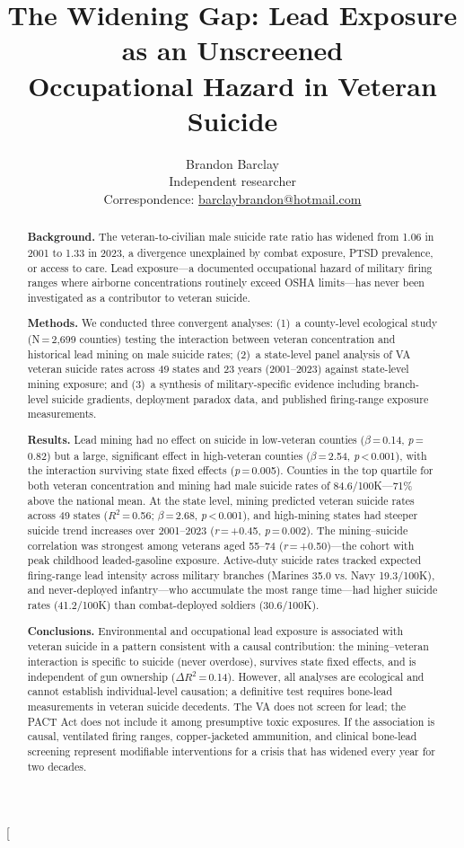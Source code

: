 \documentclass[11pt,twocolumn]{article}
\title{\textbf{The Widening Gap: Lead Exposure as an Unscreened\\Occupational Hazard in Veteran Suicide}}
\author{
    Brandon Barclay\\
    \small{Independent researcher}\\
    \small{Correspondence: \href{mailto:barclaybrandon@hotmail.com}{barclaybrandon@hotmail.com}}
}
\date{}
\begin{document}
\twocolumn[
\maketitle
\begin{@twocolumnfalse}
\begin{abstract}
\noindent\textbf{Background.} The veteran-to-civilian male suicide rate ratio has widened from 1.06 in 2001 to 1.33 in 2023, a divergence unexplained by combat exposure, PTSD prevalence, or access to care. Lead exposure---a documented occupational hazard of military firing ranges where airborne concentrations routinely exceed OSHA limits---has never been investigated as a contributor to veteran suicide.

\noindent\textbf{Methods.} We conducted three convergent analyses: (1)~a county-level ecological study (N\,=\,2,699 counties) testing the interaction between veteran concentration and historical lead mining on male suicide rates; (2)~a state-level panel analysis of VA veteran suicide rates across 49 states and 23 years (2001--2023) against state-level mining exposure; and (3)~a synthesis of military-specific evidence including branch-level suicide gradients, deployment paradox data, and published firing-range exposure measurements.

\noindent\textbf{Results.} Lead mining had no effect on suicide in low-veteran counties ($\beta$\,=\,0.14, \textit{p}\,=\,0.82) but a large, significant effect in high-veteran counties ($\beta$\,=\,2.54, \textit{p}\,<\,0.001), with the interaction surviving state fixed effects (\textit{p}\,=\,0.005). Counties in the top quartile for both veteran concentration and mining had male suicide rates of 84.6/100K---71\% above the national mean. At the state level, mining predicted veteran suicide rates across 49 states ($R^2$\,=\,0.56; $\beta$\,=\,2.68, \textit{p}\,<\,0.001), and high-mining states had steeper suicide trend increases over 2001--2023 (\textit{r}\,=\,+0.45, \textit{p}\,=\,0.002). The mining--suicide correlation was strongest among veterans aged 55--74 (\textit{r}\,=\,+0.50)---the cohort with peak childhood leaded-gasoline exposure. Active-duty suicide rates tracked expected firing-range lead intensity across military branches (Marines 35.0 vs. Navy 19.3/100K), and never-deployed infantry---who accumulate the most range time---had higher suicide rates (41.2/100K) than combat-deployed soldiers (30.6/100K).

\noindent\textbf{Conclusions.} Environmental and occupational lead exposure is associated with veteran suicide in a pattern consistent with a causal contribution: the mining--veteran interaction is specific to suicide (never overdose), survives state fixed effects, and is independent of gun ownership ($\Delta R^2$\,=\,0.14). However, all analyses are ecological and cannot establish individual-level causation; a definitive test requires bone-lead measurements in veteran suicide decedents. The VA does not screen for lead; the PACT Act does not include it among presumptive toxic exposures. If the association is causal, ventilated firing ranges, copper-jacketed ammunition, and clinical bone-lead screening represent modifiable interventions for a crisis that has widened every year for two decades.


\end{abstract}
\end{@twocolumnfalse}
\end{document}

